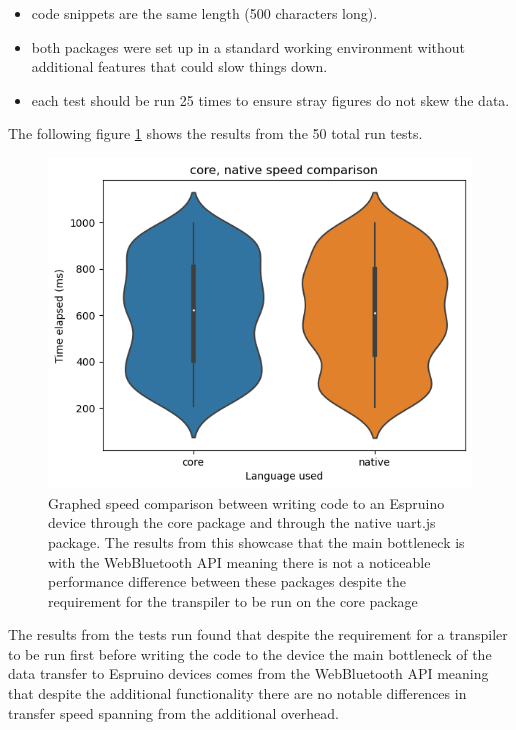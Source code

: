 \documentclass{l4proj}
\begin{document}
\begin{itemize}
    \item code snippets are the same length (500 characters long).
    \item both packages were set up in a standard working environment without additional features that could slow things down.
    \item each test should be run 25 times to ensure stray figures do not skew the data.
\end{itemize}

The following figure \ref{fig:core_native_speed} shows the results from the 50 total run tests.

\begin{figure}[H]
    \centering
    \includegraphics[width=12cm]{dissertation/images/core-native-speed.png}
    \caption{Graphed speed comparison between writing code to an Espruino device through the core package and through the native uart.js package. The results from this showcase that the main bottleneck is with the WebBluetooth API meaning there is not a noticeable performance difference between these packages despite the requirement for the transpiler to be run on the core package}
    \label{fig:core_native_speed}
\end{figure}

The results from the tests run found that despite the requirement for a transpiler to be run first before writing the code to the device the main bottleneck of the data transfer to Espruino devices comes from the WebBluetooth API meaning that despite the additional functionality there are no notable differences in transfer speed spanning from the additional overhead.
\end{document}
